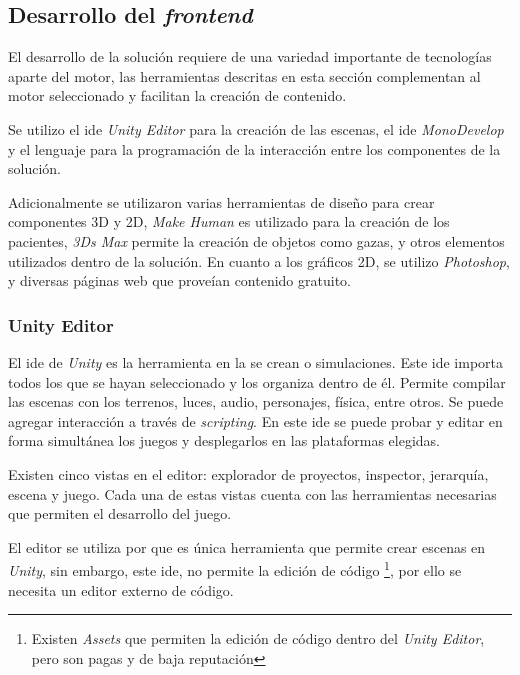 \subsection{Desarrollo del \textit{frontend}}

El desarrollo de la solución requiere de una variedad importante de tecnologías
aparte del motor, las herramientas descritas en esta sección complementan al
motor seleccionado y facilitan la creación de contenido.

Se utilizo el \Gls{ide} \textit{Unity Editor} para la creación de las escenas,
el \Gls{ide} \textit{MonoDevelop} y el lenguaje \cs{} para la programación de la
interacción entre los componentes de la solución.

Adicionalmente se utilizaron varias herramientas de diseño para crear
componentes 3D y 2D, \textit{Make Human} es utilizado para la creación de los
pacientes, \textit{3Ds Max} permite la creación de objetos como gazas, y otros
elementos utilizados dentro de la solución. En cuanto a los gráficos 2D, se
utilizo \textit{Photoshop}, y diversas páginas web que proveían contenido
gratuito.

\subsubsection{Unity Editor}


El \Gls{ide} de \textit{Unity} es la herramienta en la se crean  o simulaciones. Este \Gls{ide} importa todos los
 que se hayan seleccionado y los organiza dentro de él.
Permite compilar las escenas con los terrenos, luces, audio, personajes, física,
entre otros. Se puede agregar interacción a través de \textit{scripting}. En
este \Gls{ide} se puede probar y editar en forma simultánea los juegos y
desplegarlos en las plataformas elegidas\cite{unity3d}. 

Existen cinco vistas en el editor: explorador de proyectos, inspector,
jerarquía, escena y juego. Cada una de estas vistas cuenta con las herramientas
necesarias que permiten el desarrollo del juego\cite{unity3d}.

El editor se utiliza por que es única herramienta que permite crear escenas en
\textit{Unity}, sin embargo, este \Gls{ide}, no permite la edición de código
\footnote{Existen \textit{Assets} que permiten la edición de código dentro del
    \textit{Unity Editor}, pero son pagas y de baja reputación}, por ello se
necesita un editor externo de código.


